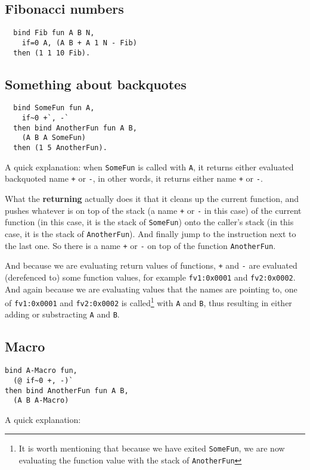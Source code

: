 \documentclass{article}
\begin{document}
\subsection{Fibonacci numbers}
\begin{verbatim}
  bind Fib fun A B N,
    if=0 A, (A B + A 1 N - Fib)
  then (1 1 10 Fib).
\end{verbatim}

\subsection{Something about backquotes}
\begin{verbatim}
  bind SomeFun fun A,
    if~0 +`, -`
  then bind AnotherFun fun A B,
    (A B A SomeFun)
  then (1 5 AnotherFun).
\end{verbatim}

A quick explanation: when \texttt{SomeFun} is called with \texttt{A}, it returns either evaluated backquoted name \texttt{+} or \texttt{-}, in other words, it returns either name \texttt{+} or \texttt{-}.

What the \textbf{returning} actually does it that it cleans up the current function, and pushes whatever is on top of the stack (a name \texttt{+} or \texttt{-} in this case) of the current function (in this case, it is the stack of \texttt{SomeFun}) onto the caller's stack (in this case, it is the stack of \texttt{AnotherFun}). And finally jump to the instruction next to the last one. So there is a name \texttt{+} or \texttt{-} on top of the function \texttt{AnotherFun}.

And because we are evaluating return values of functions, \texttt{+} and \texttt{-} are evaluated (derefenced to) some function values, for example \texttt{fv1:0x0001} and \texttt{fv2:0x0002}. And again because we are evaluating values that the names are pointing to, one of \texttt{fv1:0x0001} and \texttt{fv2:0x0002} is called\footnote{It is worth mentioning that because we have exited \texttt{SomeFun}, we are now evaluating the function value with the stack of \texttt{AnotherFun}} with \texttt{A} and \texttt{B}, thus resulting in either adding or substracting \texttt{A} and \texttt{B}.

\subsection{Macro}
\begin{verbatim}
bind A-Macro fun,
  (@ if~0 +, -)`
then bind AnotherFun fun A B,
  (A B A-Macro)
\end{verbatim}

A quick explanation:
\end{document}
